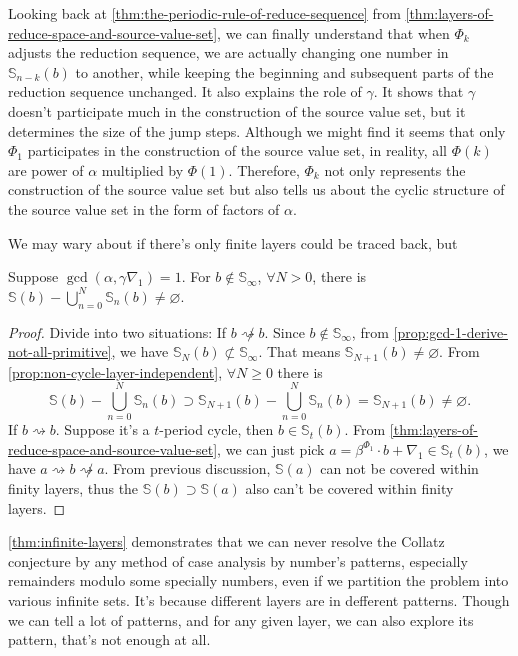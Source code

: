 Looking back at \cref{thm:the-periodic-rule-of-reduce-sequence} from \cref{thm:layers-of-reduce-space-and-source-value-set}, we can finally understand that when $\Phi_k$ adjusts the reduction sequence, we are actually changing one number in $\mathbb{S}_{n-k}(b)$ to another, while keeping the beginning and subsequent parts of the reduction sequence unchanged. It also explains the role of $\gamma$. It shows that $\gamma$ doesn't participate much in the construction of the source value set, but it determines the size of the jump steps. Although we might find it seems that only $\Phi_1$ participates in the construction of the source value set, in reality, all $\Phi(k)$ are power of $\alpha$ multiplied by $\Phi(1)$. Therefore, $\Phi_k$ not only represents the construction of the source value set but also tells us about the cyclic structure of the source value set in the form of factors of $\alpha$.

We may wary about if there's only finite layers could be traced back, but
\begin{theorem}\label{thm:infinite-layers}
	Suppose $\gcd(\alpha, \gamma\nabla_1) = 1$. For $b\not\in\mathbb{S}_{\infty}$, $\forall N > 0$, there is $\mathbb{S}(b) - \bigcup_{n=0}^{N}\mathbb{S}_{n}(b) \ne \varnothing$.
\end{theorem}
\begin{proof}
	Divide into two situations:\newline
	If $b \not\rightsquigarrow b$. Since $b\not\in\mathbb{S}_{\infty}$, from \cref{prop:gcd-1-derive-not-all-primitive}, we have $\mathbb{S}_{N}(b) \not\subset \mathbb{S}_{\infty}$. That means $\mathbb{S}_{N + 1}(b) \ne \varnothing$.
	From \cref{prop:non-cycle-layer-independent}, $\forall N \ge 0$ there is
	\[\mathbb{S}(b) - \bigcup_{n=0}^{N}\mathbb{S}_{n}(b) \supset \mathbb{S}_{N+1}(b) - \bigcup_{n=0}^{N}\mathbb{S}_{n}(b) = \mathbb{S}_{N+1}(b) \ne \varnothing.\]
	If $b \rightsquigarrow b$. Suppose it's a $t$-period cycle, then $b \in\mathbb{S}_{t}(b)$. From \cref{thm:layers-of-reduce-space-and-source-value-set}, we can just pick $a = \beta^{\Phi_1}\cdot b + \nabla_1\in\mathbb{S}_{t}(b)$, we have $a \rightsquigarrow b \not\rightsquigarrow a$. From previous discussion, $\mathbb{S}(a)$ can not be covered within finity layers, thus the $\mathbb{S}(b) \supset \mathbb{S}(a)$ also can't be covered within finity layers.
\end{proof}

\cref{thm:infinite-layers} demonstrates that we can never resolve the Collatz conjecture by any method of case analysis by number's patterns, especially remainders modulo some specially numbers, even if we partition the problem into various infinite sets. It's because different layers are in defferent patterns. Though we can tell a lot of patterns, and for any given layer, we can also explore its pattern, that's not enough at all.

